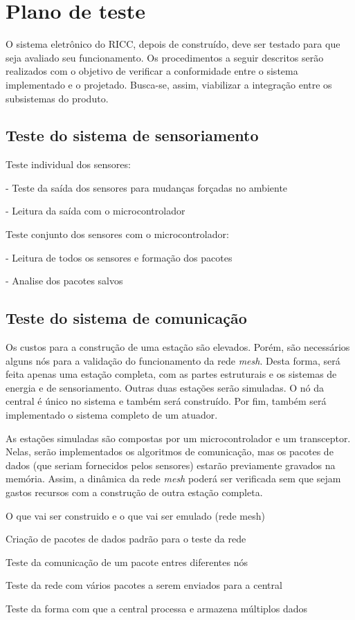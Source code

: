 \section{Plano de teste}

	O sistema eletrônico do RICC, depois de construído, deve ser testado para que seja avaliado seu funcionamento. Os procedimentos a seguir descritos serão realizados com o objetivo de verificar a conformidade entre o sistema implementado e o projetado. Busca-se, assim, viabilizar a integração entre os subsistemas do produto. 

	\subsection{Teste do sistema de sensoriamento}
		Teste individual dos sensores:
			
			- Teste da saída dos sensores para mudanças forçadas no ambiente
			
			- Leitura da saída com o microcontrolador
		
		Teste conjunto dos sensores com o microcontrolador:
		
			- Leitura de todos os sensores e formação dos pacotes
			
			- Analise dos pacotes salvos
	
	\subsection{Teste do sistema de comunicação}
	
		Os custos para a construção de uma estação são elevados. Porém, são necessários alguns nós para a validação do funcionamento da rede \emph{mesh}. Desta forma, será feita apenas uma estação completa, com as partes estruturais e os sistemas de energia e de sensoriamento. Outras duas estações serão simuladas. O nó da central é único no sistema e também será construído. Por fim, também será implementado o sistema completo de um atuador. 
	
		As estações simuladas são compostas por um microcontrolador e um transceptor. Nelas, serão implementados os algoritmos de comunicação, mas os pacotes de dados (que seriam fornecidos pelos sensores) estarão previamente gravados na memória. Assim, a dinâmica da rede \emph{mesh} poderá ser verificada sem que sejam gastos recursos com a construção de outra estação completa.  
		
		O que vai ser construido e o que vai ser emulado (rede mesh)
		
		Criação de pacotes de dados padrão para o teste da rede
		
		Teste da comunicação de um pacote entres diferentes nós 

		Teste da rede com vários pacotes a serem enviados para a central
		
		Teste da forma com que a central processa e armazena múltiplos dados